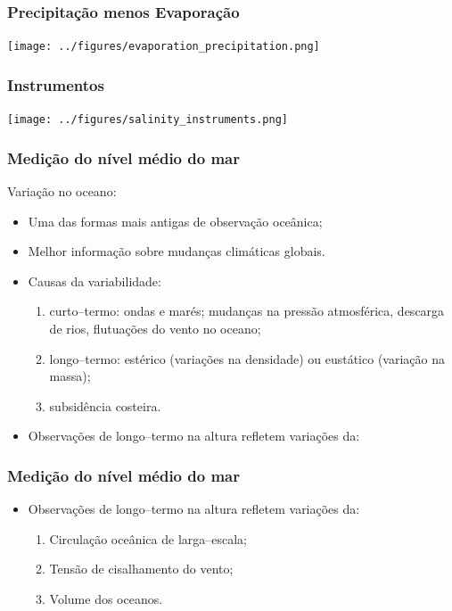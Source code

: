 \begin{frame}
\frametitle{Precipitação menos Evaporação}
    \begin{center}
        \texttt{[image: ../figures/evaporation\_precipitation.png]}
    \end{center}
\end{frame}

\begin{frame}
\frametitle{Instrumentos}
    \begin{center}
        \texttt{[image: ../figures/salinity\_instruments.png]}
    \end{center}
\end{frame}

\begin{frame}
\frametitle{Medição do nível médio do mar}
Variação no oceano:
    \small{
    \begin{itemize}[<+-| alert@+>]
    \item Uma das formas mais antigas de observação oceânica;
    \item Melhor informação sobre mudanças climáticas globais.
    \item Causas da variabilidade:
        \begin{enumerate}[<+-| alert@+>]
            \item curto--termo: ondas e marés; mudanças na pressão atmosférica,
                  descarga de rios, flutuações do vento no oceano;
            \item longo--termo: estérico (variações na densidade) ou eustático
                  (variação na massa);
            \item subsidência costeira.
        \end{enumerate}
    \item Observações de longo--termo na altura refletem variações da:
    \end{itemize}
    }
\end{frame}

\begin{frame}
\frametitle{Medição do nível médio do mar}
    \small{
    \begin{itemize}
    \item Observações de longo--termo na altura refletem variações da:
        \begin{enumerate}[<+-| alert@+>]
            \item Circulação oceânica de larga–escala;
            \item Tensão de cisalhamento do vento;
            \item Volume dos oceanos.
        \end{enumerate}
    \end{itemize}
    }
\end{frame}


